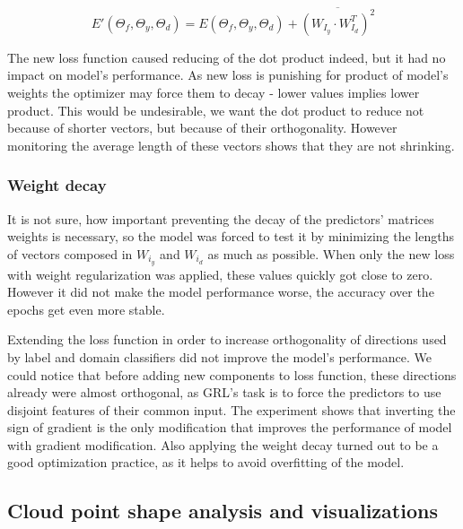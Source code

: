 \documentclass{article}
\begin{document}
\begin{equation*}
E'(\Theta_{f}, \Theta_{y}, \Theta_{d}) = E(\Theta_{f}, \Theta_{y}, \Theta_{d}) + \overline{(W_{I_{y}} \cdot W_{I_{d}}^{T})^{2}}
\end{equation*}
\par
The new loss function caused reducing of the dot product indeed, but it had no impact on model's performance. As new loss is punishing for product of model's weights the optimizer may force them to decay - lower values implies lower product. This would be undesirable, we want the dot product to reduce not because of shorter vectors, but because of their orthogonality. However monitoring the average length of these vectors shows that they are not shrinking. 
\subsubsection{Weight decay}
It is not sure, how important preventing the decay of the predictors' matrices weights is necessary, so the model was forced to test it by minimizing the lengths of vectors composed in $W_{i_{y}}$ and $W_{i_{d}}$ as much as possible. When only the new loss with weight regularization was applied, these values quickly got close to zero. However it did not make the model performance worse, the accuracy over the epochs get even more stable.
\par
Extending the loss function in order to increase orthogonality of directions used by label and domain classifiers did not improve the model's performance. We could notice that before adding new components to loss function, these directions already were almost orthogonal, as GRL's task is to force the predictors to use disjoint features of their common input. The experiment shows that inverting the sign of gradient is the only modification that improves the performance of model with gradient modification. Also applying the weight decay turned out to be a good optimization practice, as it helps to avoid overfitting of the model.

\subsection{Cloud point shape analysis and visualizations}
\end{document}
